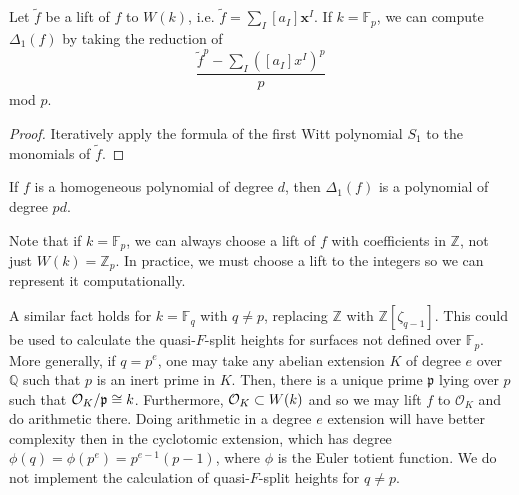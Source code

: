 
\begin{prop}
	\label{prop:delta1:formula}
	Let \(\tilde{f}\) be a lift of \(f\) to \(W(k)\),
	i.e.
	\(\tilde{f} = \sum_{I}^{} [a_{I}] \mathbf{x}^{I}\).
	If \(k = \mathbb{F}_{p}\),
	we can compute \(\Delta_{1}(f)\) by 
	taking the reduction of
	\[
		\frac{\tilde{f}^{p} - \sum_{I}^{} ([a_{I}]x^{I})^{p} }{p}
	\] 
	mod \(p\).
\end{prop}

\begin{proof}
	Iteratively apply the formula of the first
	Witt polynomial \(S_{1}\) 
	to the monomials of \(\tilde{f}\).
\end{proof}

\begin{rmk}
	If \(f\) is a homogeneous polynomial of degree \(d\), 
	then \(\Delta_{1}(f)\) is a polynomial of degree \(pd\).
\end{rmk}

\begin{rmk}
    \label{rmk:lift:roi}
    Note that if \(k = \mathbb{F}_{p}\), we can always choose a lift
    of \(f\) with coefficients in \(\mathbb{Z}\), 
    not just \(W(k) = \mathbb{Z}_{p}\).
    In practice, we must choose a lift to the integers
    so we can represent it computationally.

    A similar fact holds for \(k = \mathbb{F}_{q}\) with 
    \(q \neq p\), replacing \(\mathbb{Z}\) with
    \(\mathbb{Z}[\zeta_{q-1}]\).
    This could be used to calculate the quasi-\(F\)-split 
    heights for surfaces not defined over \(\mathbb{F}_{p}\).
    More generally, if \(q = p^{e}\), one may take
    any abelian extension \(K\) of degree \(e\) over \(\mathbb{Q}\) such that
    \(p\) is an inert prime in \(K\).
    Then, there is a unique prime \(\mathfrak{p}\) lying over \(p\) 
    such that \(\mathcal{O}_{K} / \mathfrak{p} \cong k\).
    Furthermore, \(\mathcal{O}_{K} \subset W(k)\)
    and so we may lift \(f\) to \(\mathcal{O}_{K}\) 
    and do arithmetic there. 
    Doing arithmetic in a degree \(e\) extension will have
    better complexity then in the cyclotomic extension, which
    has degree \(\phi(q) = \phi(p^{e}) = p^{e-1}(p-1)\), where
    \(\phi\) is the Euler totient function.
    We do not implement the calculation of quasi-\(F\)-split
    heights for \(q \neq p\).
\end{rmk}



